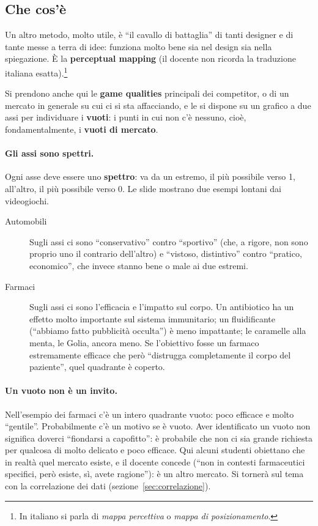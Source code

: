

\subsection{Che cos'è}

Un altro metodo, molto utile, è ``il cavallo di battaglia'' di tanti
designer e di tante messe a terra di idee: funziona molto bene sia nel design
sia nella spiegazione. È la \textbf{perceptual mapping} (il docente non
ricorda la traduzione italiana esatta).\footnote{In italiano si parla di
\emph{mappa percettiva} o \emph{mappa di posizionamento}.}

Si prendono anche qui le \textbf{game qualities} principali dei competitor, o
di un mercato in generale su cui ci si sta affacciando, e le si dispone su
un grafico a due assi per individuare i \textbf{vuoti}: i punti in cui non
c'è nessuno, cioè, fondamentalmente, i \textbf{vuoti di mercato}.

\paragraph{Gli assi sono spettri.} Ogni asse deve essere uno
\textbf{spettro}: va da un estremo, il più possibile verso 1, all'altro, il
più possibile verso 0. Le slide mostrano due esempi lontani dai videogiochi.
\begin{description}
  \item[Automobili] Sugli assi ci sono ``conservativo'' contro ``sportivo''
        (che, a rigore, non sono proprio uno il contrario dell'altro) e
        ``vistoso, distintivo'' contro ``pratico, economico'', che invece
        stanno bene o male ai due estremi.
  \item[Farmaci] Sugli assi ci sono l'efficacia e l'impatto sul corpo. Un
        antibiotico ha un effetto molto importante sul sistema immunitario;
        un fluidificante (``abbiamo fatto pubblicità occulta'') è meno
        impattante; le caramelle alla menta, le Golia, ancora meno. Se
        l'obiettivo fosse un farmaco estremamente efficace che però
        ``distrugga completamente il corpo del paziente'', quel quadrante è
        coperto.
\end{description}

\paragraph{Un vuoto non è un invito.} Nell'esempio dei farmaci c'è un intero
quadrante vuoto: poco efficace e molto ``gentile''. Probabilmente c'è un
motivo se è vuoto. Aver identificato un vuoto non significa doverci
``fiondarsi a capofitto'': è probabile che non ci sia grande richiesta per
qualcosa di molto delicato e poco efficace. Qui alcuni studenti obiettano che
in realtà quel mercato esiste, e il docente concede (``non in contesti
farmaceutici specifici, però esiste, sì, avete ragione''): è un altro
mercato. Si tornerà sul tema con la correlazione dei dati
(sezione~\ref{sec:correlazione}).

